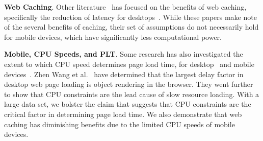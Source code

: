 \textbf{Web Caching}. Other literature~\cite{web-caching-1, web-caching-2, web-caching-8, web-caching-9} has focused on the benefits of web caching, specifically the reduction of latency for desktops~\cite{web-caching-3, web-caching-4, web-caching-5, web-caching-6, web-caching-7}.
While these papers make note of the several benefits of caching, their set of assumptions do not necessarily hold for mobile devices, which have significantly less computational power. 

\textbf{Mobile, CPU Speeds, and PLT}.
Some research has also investigated the extent to which CPU speed determines page load time, for desktop~\cite{CPU-plt-1} and mobile devices~\cite{CPU-plt-2, CPU-plt-3}.
Zhen Wang et al.~\cite{CPU-plt-2, CPU-plt-3} have determined that the largest delay factor in desktop web page loading is object rendering in the browser. They went further to show that CPU constraints are the lead cause of slow resource loading.
With a large data set, we bolster the claim that suggests that CPU constraints are the critical factor in determining page load time. We also demonstrate that web caching has diminishing benefits due to the limited CPU speeds of mobile devices.

